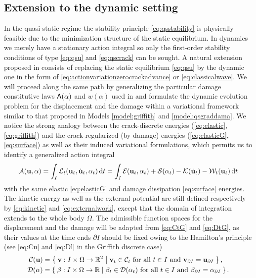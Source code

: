 \subsection{Extension to the dynamic setting}
In the quasi-static regime the stability principle \eqref{eq:qsstability} is physically feasible due to the minimization structure of the static equilibrium. In dynamics we merely have a stationary action integral so only the first-order stability conditions of type \eqref{eq:qsu} and \eqref{eq:qscrack} can be sought. A natural extension proposed in \cite{Bourdin:2011} consists of replacing the static equilibrium \eqref{eq:qsu} by the dynamic one in the form of \eqref{eq:actionvariationzerocrackadvance} or \eqref{eq:classicalwave}. We will proceed along the same path by generalizing the particular damage constitutive laws $\mathsf{A}(\alpha)$ and $w(\alpha)$ used in \cite{Bourdin:2011} and formulate the dynamic evolution problem for the displacement and the damage within a variational framework similar to that proposed in Models \ref{model:griffith} and \ref{model:qsgraddama}. We notice the strong analogy between the crack-discrete energies (\ref{eq:elastic}, \ref{eq:griffith}) and the crack-regularized (by damage) energies (\ref{eq:elasticG}, \ref{eq:surface}) as well as their induced variational formulations, which permits us to identify a generalized action integral
\begin{equation} \label{eq:actionG}
\mathcal{A}(\vec{u},\alpha)=\int_I\mathcal{L}_t(\vec{u}_t,\dot{\vec{u}}_t,\alpha_t)\,\mathrm{d}t=\int_I\mathcal{E}(\vec{u}_t,\alpha_t)+\mathcal{S}(\alpha_t)-\mathcal{K}(\dot{\vec{u}}_t)-\mathcal{W}_t(\vec{u}_t)\D{t}
\end{equation}
with the same elastic \eqref{eq:elasticG} and damage dissipation \eqref{eq:surface} energies. The kinetic energy as well as the external potential are still defined respectively by \eqref{eq:kinetic} and \eqref{eq:externalwork}, except that the domain of integration extends to the whole body $\Omega$. The admissible function spaces for the displacement and the damage will be adapted from \eqref{eq:CtG} and \eqref{eq:DtG}, as their values at the time ends $\partial I$ should be fixed owing to the Hamilton's principle (see \eqref{eq:Cu} and \eqref{eq:Dl} in the Griffith discrete case)
\begin{equation} \label{eq:CuDalpha}
\begin{aligned}
\mathcal{C}(\vec{u}) &= \set{\vec{v}:I\times\Omega\to\mathbb{R}^2|\vec{v}_t\in\mathcal{C}_t\text{ for all $t\in I$ and }\vec{v}_{\partial I}=\vec{u}_{\partial I}}, \\
\mathcal{D}(\alpha) &= \set{\beta:I\times\Omega\to\mathbb{R}|\beta_t\in\mathcal{D}(\alpha_t)\text{ for all $t\in I$ and }\beta_{\partial I}=\alpha_{\partial I}}.
\end{aligned}
\end{equation}

